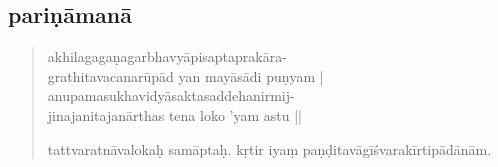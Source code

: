 \documentclass[12pt]{article}
\begin{document}
% 
 
\subsection{pariṇāmanā}
\begin{quote}
	akhilagagaṇagarbhavyāpisaptaprakāra-\footnoteB{
		°saptaprakāra°] \EDD ; °sarvaprakāra° \MS
	}\\
	grathitavacanarūpād yan mayāsādi puṇyam |\\
	anupamasukhavidyāsaktasaddehanirmij-\\
	jinajanitajanārthas tena loko 'yam astu ||

	tattvaratnāvalokaḥ samāptaḥ. kṛtir iyaṃ paṇḍitavāgīśvarakīrtipādānām.\\

% 
\end{quote}
\end{document}
